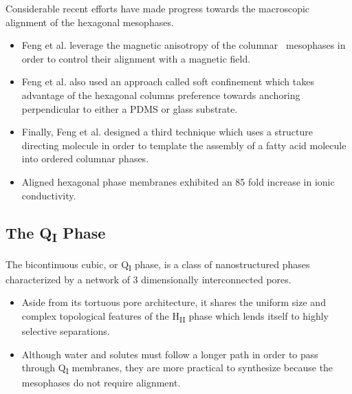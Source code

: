   Considerable recent efforts have made progress towards the macroscopic
  alignment of the hexagonal mesophases.
  \begin{itemize}
    \item Feng et al. leverage the magnetic anisotropy of the columnar \
    mesophases in order to control their alignment with a magnetic field.~\cite{feng_scalable_2014}
    \item Feng et al. also used an approach called soft confinement which
    takes advantage of the hexagonal columns preference towards anchoring
    perpendicular to either a PDMS or glass substrate.~\cite{feng_thin_2016}
    \item Finally, Feng et al. designed a third technique which uses a structure
    directing molecule in order to template the assembly of a fatty acid 
    molecule into ordered columnar phases.~\cite{feng_highly_2017}
    \item Aligned hexagonal phase membranes exhibited an 85 fold increase in 
    ionic conductivity.~\cite{feng_scalable_2014}
  \end{itemize}
  
  \subsection{The Q\textsubscript{I} Phase}
  
  The bicontinuous cubic, or Q\textsubscript{I} phase, is a class 
  of nanostructured phases characterized by a network of 3 dimensionally
  interconnected pores.
  \begin{itemize}
    \item Aside from its tortuous pore architecture, it shares the 
    uniform size and complex topological features of the H\textsubscript{II} phase
    which lends itself to highly selective separations.
    \item Although water and solutes must follow a longer path in order to pass
    through Q\textsubscript{I} membranes, they are more practical to synthesize
    because the mesophases do not require alignment. 
  \end{itemize}
  
